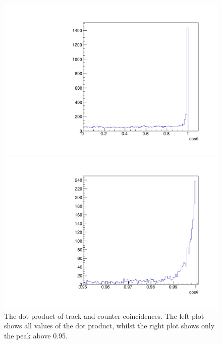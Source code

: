 \begin{figure}[h!]
  \centering
  \begin{minipage}{0.45\textwidth}
    \centering
    \includegraphics[width=\textwidth]{CosTheta_Data}
  \end{minipage}
  \begin{minipage}{0.45\textwidth}
    \centering
    \includegraphics[width=\textwidth]{CosThetaZoom_Data}
  \end{minipage}
  \caption[The dot product of track and counter coincidences]{The dot product of track and counter coincidences. The left plot shows all values of the dot product, whilst the right plot shows only the peak above 0.95.}
  \label{fig:CounterCoincidence}
\end{figure}

